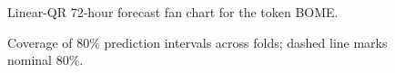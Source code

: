 \documentclass[
  a4paper,
  DIV=11,
  numbers=noendperiod]{scrreprt}
\begin{document}
\begin{figure}


\caption{\label{fig-lqr-fan-longest}Linear-QR 72-hour forecast fan chart
for the token BOME.}

\end{figure}%

\begin{figure}


\caption{\label{fig-lqr-coverage-80pi-hist}Coverage of 80\% prediction
intervals across folds; dashed line marks nominal 80\%.}

\end{figure}%
\end{document}
